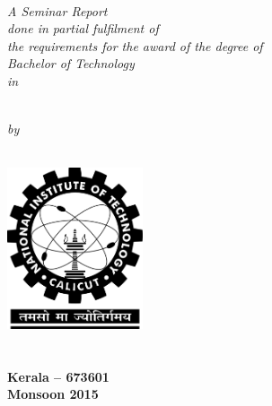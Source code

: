 \begin{titlepage}
\begin{center}

\huge \textbf {\myTopic{}}\\[1.5cm]

\small
	\emph{A Seminar Report\\
	done in partial fulfilment of\\
	the requirements for the award of the degree of}\\[0.5cm]

\large \emph{Bachelor of Technology}\\
\small \emph{in}\par
\large \emph{\myBranchName{}}\\[0.5cm]

\Large \emph{by}\\[1cm]

\small \textbf{\myName{}\\
	\myRollNo{}}

\vfill

\includegraphics[width=0.30\textwidth]{./nitc-logo.png}\\[0.5cm]
\large \textbf{\myDeptName{}}\\
\Large \textbf{\myCollegeName{}}\\

\small \textbf{Kerala -- 673601\\
		Monsoon 2015}

\end{center}
\end{titlepage}
